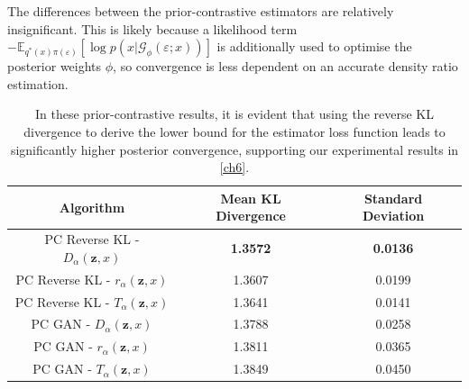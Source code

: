 \documentclass[honours,12pt]{unswthesis}
\newcommand{\E}{\mathbb{E}}
\numberwithin{equation}{section}
\theoremstyle{definition}
\begin{document}
The differences between the prior-contrastive estimators are relatively insignificant. This is likely because a likelihood term $-\E_{q^*(x)\pi(\varepsilon)}[\log p(x|\mathcal{G}_\phi(\varepsilon;x))]$ is additionally used to optimise the posterior weights $\phi$, so convergence is less dependent on an accurate density ratio estimation.
\newpage
\begin{table}[h]
\centering
\begin{tabular}{|c|c|c|}
\hline
Algorithm & Mean KL Divergence & Standard Deviation\\
\hline
PC Reverse KL - $D_\alpha(\bm{z},x)$ & \textbf{1.3572} & \textbf{0.0136}\\
\hline
PC Reverse KL - $r_\alpha(\bm{z},x)$ & 1.3607 & 0.0199\\
\hline
PC Reverse KL - $T_\alpha(\bm{z},x)$ & 1.3641 & 0.0141\\
\hline
PC GAN - $D_\alpha(\bm{z},x)$ & 1.3788 & 0.0258\\
\hline
PC GAN - $r_\alpha(\bm{z},x)$ & 1.3811 & 0.0365\\
\hline
PC GAN - $T_\alpha(\bm{z},x)$ & 1.3849 & 0.0450\\
\hline
\end{tabular}
\caption{\small In these prior-contrastive results, it is evident that using the reverse KL divergence to derive the lower bound for the estimator loss function leads to significantly higher posterior convergence, supporting our experimental results in \autoref{ch6}.}
\label{tab:7.1}
\end{table}
\end{document}
